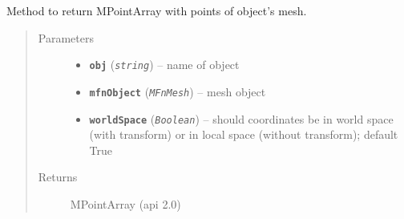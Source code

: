 \documentclass[letterpaper,10pt,english]{sphinxmanual}
\begin{document}

\begin{fulllineitems}
\label{pk_src.misc:pk_src.misc.getPoints}
Method to return MPointArray with points of object's mesh.
\begin{quote}\begin{description}
\item[{Parameters}] \leavevmode\begin{itemize}
\item {} 
\textbf{\texttt{obj}} (\emph{\texttt{string}}) -- name of object

\item {} 
\textbf{\texttt{mfnObject}} (\emph{\texttt{MFnMesh}}) -- mesh object

\item {} 
\textbf{\texttt{worldSpace}} (\emph{\texttt{Boolean}}) -- should coordinates be in world space (with transform) or in local space (without transform); default True

\end{itemize}

\item[{Returns}] \leavevmode
MPointArray (api 2.0)


\end{description}
\end{quote}
\end{fulllineitems}
\end{document}
